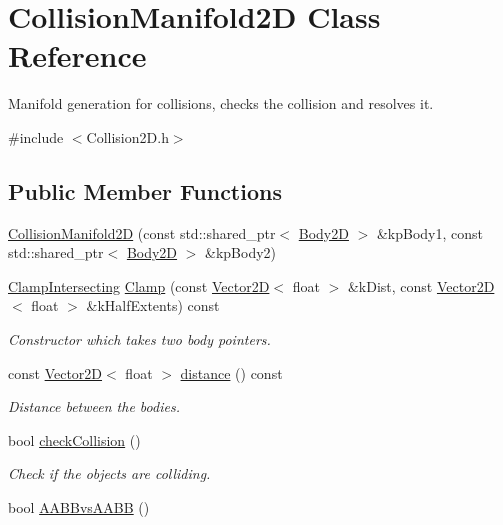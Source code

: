 \hypertarget{class_collision_manifold2_d}{\section{Collision\+Manifold2\+D Class Reference}
\label{class_collision_manifold2_d}
}


Manifold generation for collisions, checks the collision and resolves it.  




{\ttfamily \#include $<$Collision2\+D.\+h$>$}

\subsection*{Public Member Functions}
\begin{DoxyCompactItemize}
\item 
\hyperlink{class_collision_manifold2_d_af6120e277cf4d8d5b6cc2a67e621c45d}{Collision\+Manifold2\+D} (const std\+::shared\+\_\+ptr$<$ \hyperlink{class_body2_d}{Body2\+D} $>$ \&kp\+Body1, const std\+::shared\+\_\+ptr$<$ \hyperlink{class_body2_d}{Body2\+D} $>$ \&kp\+Body2)
\item 
\hyperlink{struct_clamp_intersecting}{Clamp\+Intersecting} \hyperlink{class_collision_manifold2_d_a0f1383fe1b5c73b8d638b2baaf08219f}{Clamp} (const \hyperlink{class_vector2_d}{Vector2\+D}$<$ float $>$ \&k\+Dist, const \hyperlink{class_vector2_d}{Vector2\+D}$<$ float $>$ \&k\+Half\+Extents) const 
\begin{DoxyCompactList}\small\item\em Constructor which takes two body pointers. \end{DoxyCompactList}\item 
const \hyperlink{class_vector2_d}{Vector2\+D}$<$ float $>$ \hyperlink{class_collision_manifold2_d_a417217e2fcbb175cbb18577760466ea8}{distance} () const 
\begin{DoxyCompactList}\small\item\em Distance between the bodies. \end{DoxyCompactList}\item 
\hypertarget{class_collision_manifold2_d_a2cc491b84be92c80fb1ab17eb4140c7e}{bool \hyperlink{class_collision_manifold2_d_a2cc491b84be92c80fb1ab17eb4140c7e}{check\+Collision} ()}\label{class_collision_manifold2_d_a2cc491b84be92c80fb1ab17eb4140c7e}

\begin{DoxyCompactList}\small\item\em Check if the objects are colliding. \end{DoxyCompactList}\item 
\hypertarget{class_collision_manifold2_d_a0037327cbc9544ba24a6aafb5dec5855}{bool \hyperlink{class_collision_manifold2_d_a0037327cbc9544ba24a6aafb5dec5855}{A\+A\+B\+Bvs\+A\+A\+B\+B} ()}\label{class_collision_manifold2_d_a0037327cbc9544ba24a6aafb5dec5855}


\end{DoxyCompactItemize}

